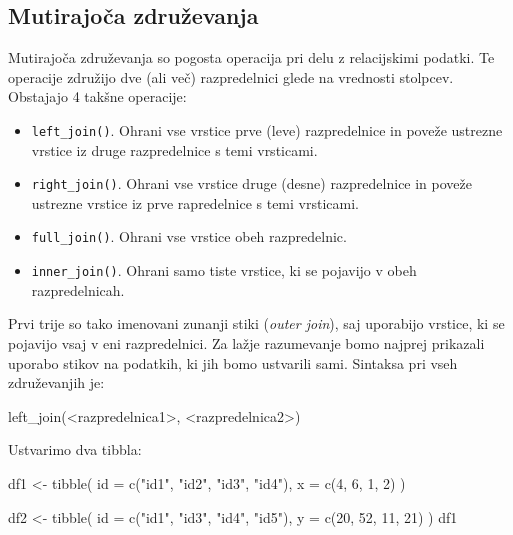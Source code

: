 \documentclass[
]{book}
\newenvironment{Shaded}{\begin{snugshade}}{\end{snugshade}}
\newcommand{\AttributeTok}[1]{\textcolor[rgb]{0.77,0.63,0.00}{#1}}
\newcommand{\DecValTok}[1]{\textcolor[rgb]{0.00,0.00,0.81}{#1}}
\newcommand{\FunctionTok}[1]{\textcolor[rgb]{0.00,0.00,0.00}{#1}}
\newcommand{\NormalTok}[1]{#1}
\newcommand{\OtherTok}[1]{\textcolor[rgb]{0.56,0.35,0.01}{#1}}
\newcommand{\SpecialCharTok}[1]{\textcolor[rgb]{0.00,0.00,0.00}{#1}}
\newcommand{\StringTok}[1]{\textcolor[rgb]{0.31,0.60,0.02}{#1}}
\providecommand{\tightlist}{%
  \setlength{\itemsep}{0pt}\setlength{\parskip}{0pt}}
\begin{document}
\hypertarget{mutirajoux10da-zdruux17eevanja}{%
\subsection{Mutirajoča združevanja}\label{mutirajoux10da-zdruux17eevanja}}

Mutirajoča združevanja so pogosta operacija pri delu z relacijskimi podatki. Te operacije združijo dve (ali več) razpredelnici glede na vrednosti stolpcev. Obstajajo 4 takšne operacije:

\begin{itemize}
\tightlist
\item
  \texttt{left\_join()}. Ohrani vse vrstice prve (leve) razpredelnice in poveže ustrezne vrstice iz druge razpredelnice s temi vrsticami.
\item
  \texttt{right\_join()}. Ohrani vse vrstice druge (desne) razpredelnice in poveže ustrezne vrstice iz prve rapredelnice s temi vrsticami.
\item
  \texttt{full\_join()}. Ohrani vse vrstice obeh razpredelnic.
\item
  \texttt{inner\_join()}. Ohrani samo tiste vrstice, ki se pojavijo v obeh razpredelnicah.
\end{itemize}

Prvi trije so tako imenovani zunanji stiki (\emph{outer join}), saj uporabijo vrstice, ki se pojavijo vsaj v eni razpredelnici. Za lažje razumevanje bomo najprej prikazali uporabo stikov na podatkih, ki jih bomo ustvarili sami. Sintaksa pri vseh združevanjih je:

\begin{Shaded}
\begin{Highlighting}[]
\FunctionTok{left\_join}\NormalTok{(}\SpecialCharTok{\textless{}}\NormalTok{razpredelnica1}\SpecialCharTok{\textgreater{}}\NormalTok{, }\SpecialCharTok{\textless{}}\NormalTok{razpredelnica2}\SpecialCharTok{\textgreater{}}\NormalTok{)}
\end{Highlighting}
\end{Shaded}

Ustvarimo dva tibbla:

\begin{Shaded}
\begin{Highlighting}[]
\NormalTok{df1 }\OtherTok{\textless{}{-}} \FunctionTok{tibble}\NormalTok{(}
  \AttributeTok{id =} \FunctionTok{c}\NormalTok{(}\StringTok{"id1"}\NormalTok{, }\StringTok{"id2"}\NormalTok{, }\StringTok{"id3"}\NormalTok{, }\StringTok{"id4"}\NormalTok{),}
  \AttributeTok{x =} \FunctionTok{c}\NormalTok{(}\DecValTok{4}\NormalTok{, }\DecValTok{6}\NormalTok{, }\DecValTok{1}\NormalTok{, }\DecValTok{2}\NormalTok{)}
\NormalTok{)}

\NormalTok{df2 }\OtherTok{\textless{}{-}} \FunctionTok{tibble}\NormalTok{(}
  \AttributeTok{id =} \FunctionTok{c}\NormalTok{(}\StringTok{"id1"}\NormalTok{, }\StringTok{"id3"}\NormalTok{, }\StringTok{"id4"}\NormalTok{, }\StringTok{"id5"}\NormalTok{),}
  \AttributeTok{y =} \FunctionTok{c}\NormalTok{(}\DecValTok{20}\NormalTok{, }\DecValTok{52}\NormalTok{, }\DecValTok{11}\NormalTok{, }\DecValTok{21}\NormalTok{)}
\NormalTok{)}
\NormalTok{df1}
\end{Highlighting}
\end{Shaded}
\end{document}
